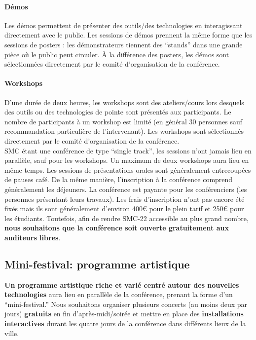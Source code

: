 \documentclass[fontsize=12pt]{scrartcl} %
\numberwithin{equation}{section} %
\numberwithin{table}{section} %
\begin{document}
\paragraph{\textbf{Démos}} Les démos permettent de présenter des outils/des technologies en interagissant directement avec le public. Les sessions de démos prennent la même forme que les sessions de posters : les démonstrateurs tiennent des ``stands'' dans une grande pièce où le public peut circuler. À la différence des posters, les démos sont sélectionnées directement par le comité d'organisation de la conférence.

\paragraph{\textbf{Workshops}} D'une durée de deux heures, les workshops sont des ateliers/cours lors desquels des outils ou des technologies de pointe sont présentés aux participants. Le nombre de participants à un workshop est limité (en général 30 personnes sauf recommandation particulière de l'intervenant). Les workshops sont sélectionnés directement par le comité d'organisation de la conférence.\\

SMC étant une conférence de type ``single track'', les sessions n'ont jamais lieu en parallèle, sauf pour les workshops. Un maximum de deux workshops aura lieu en même temps. Les sessions de présentations orales sont généralement entrecoupées de pauses café. De la même manière, l'inscription à la conférence comprend généralement les déjeuners. La conférence est payante pour les conférenciers (les personnes présentant leurs travaux). Les frais d'inscription n'ont pas encore été fixés mais ils sont généralement d'environ 400\euro{} pour le plein tarif et 250\euro{} pour les étudiants. Toutefois, afin de rendre SMC-22 accessible au plus grand nombre, \textbf{nous souhaitons que la conférence soit ouverte gratuitement aux auditeurs libres}.

\subsection{Mini-festival: programme artistique} 

\textbf{Un programme artistique riche et varié centré autour des nouvelles technologies} aura lieu en parallèle de la conférence, prenant la forme d'un ``mini-festival.'' Nous souhaitons organiser plusieurs concerts (au moins deux par jours) \textbf{gratuits} en fin d'après-midi/soirée et mettre en place des \textbf{installations interactives} durant les quatre jours de la conférence dans différents lieux de la ville. 
\end{document}
